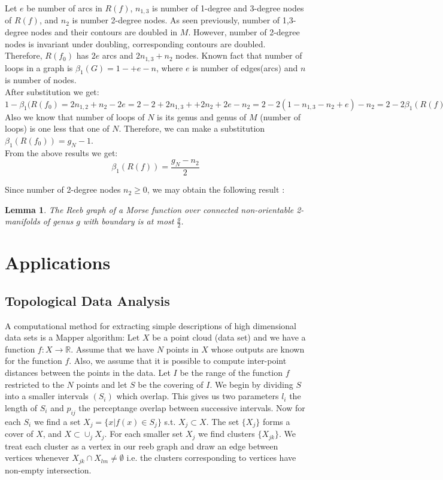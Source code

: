 \documentclass[]{article}
\newtheorem{lemma}{Lemma}
\newcommand{\R}{\mathbb{R}}
\begin{document}
Let $e$ be number of arcs in $R(f)$, $n_{1,3}$ is number of 1-degree and 3-degree nodes of $R(f)$, and $n_2$ is number 2-degree nodes. As seen previously, number of 1,3-degree nodes and their contours are doubled in $M$. However, number of 2-degree nodes is invariant under doubling, corresponding contours are doubled. \\

Therefore, $R(f_0)$ has $2e$ arcs and $2n_{1,3}+n_2$ nodes. Known fact that number of loops in a graph is $\beta_1 (G)=1-+e-n$, where $e$ is number of edges(arcs) and $n$ is number of nodes. \\
After substitution we get:
$1-\beta_1(R(f_0)=2n_{1,2}+n_2-2e=2-2+2n_{1,3}++2n_2+2e-n_2=2-2(1-n_{1,3}-n_2+e)-n_2=2-2\beta_1(R(f))-n_2$ 
\\
Also we know that number of loops of $N$ is its genus and genus of $M$ (number of loops) is one less that one of $N$. Therefore, we can make a substitution $\beta_1(R(f_0))=g_N-1$. \\
From the above results we get: 
\begin{equation}
\beta_1(R(f))=\frac{g_N-n_2}{2}
\end{equation}

Since number of 2-degree nodes $n_2\geq0 $, we may obtain the following result \cite{Reebgraphs}:
\begin{lemma}
The Reeb graph of a Morse function over connected non-orientable 2-manifolds of genus $g$ with boundary is at most $\frac{g}{2}$.
\end{lemma}

\section{Applications}
\subsection{Topological Data Analysis}
A computational method for extracting simple descriptions of high dimensional data sets is a Mapper algorithm:
Let $X$ be a point cloud (data set) and we have a function $f:X \to \R$.
Assume that we have $N$ points in $X$ whose outputs are known for the function $f$.
Also, we assume that it is possible to compute inter-point distances between the points in the data.
Let $I$ be the range of the function $f$ restricted to the $N$ points and let $S$ be the covering of $I$.
We begin by dividing $S$ into a smaller intervals $(S_i)$ which overlap.
This gives us two parameters $l_i$ the length of $S_i$ and $p_{ij}$ the perceptange overlap between successive intervals.
Now for each $S_i$ we find a set $X_j = \{x | f(x) \in S_j\}$ s.t. $X_j \subset X$. The set $\{X_j\}$ forms a cover of $X$, and $X \subset \cup_j X_j$.
For each smaller set $X_j$ we find clusters $\{X_{jk}\} $.
We treat each cluster as a vertex in our reeb graph and draw an edge between vertices whenever $X_{jk} \cap X_{lm} \neq \emptyset$ i.e. the clusters corresponding to vertices have non-empty intersection. \\
\end{document}
